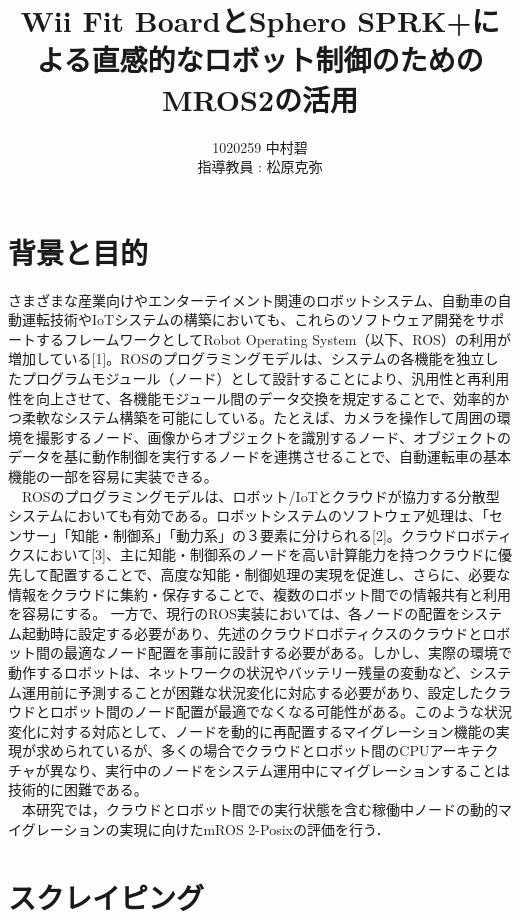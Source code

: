 \documentclass[11pt]{ujarticle}
\author{%
1020259 中村碧\\指導教員 : 松原克弥
}
\title{Wii Fit BoardとSphero SPRK+による直感的なロボット制御のためのMROS2の活用}
\begin{document}
\maketitle

\section{背景と目的}
さまざまな産業向けやエンターテイメント関連のロボットシステム、自動車の自動運転技術やIoTシステムの構築においても、これらのソフトウェア開発をサポートするフレームワークとしてRobot Operating System（以下、ROS）の利用が増加している[1]。ROSのプログラミングモデルは、システムの各機能を独立したプログラムモジュール（ノード）として設計することにより、汎用性と再利用性を向上させて、各機能モジュール間のデータ交換を規定することで、効率的かつ柔軟なシステム構築を可能にしている。たとえば、カメラを操作して周囲の環境を撮影するノード、画像からオブジェクトを識別するノード、オブジェクトのデータを基に動作制御を実行するノードを連携させることで、自動運転車の基本機能の一部を容易に実装できる。
\\　ROSのプログラミングモデルは、ロボット/IoTとクラウドが協力する分散型システムにおいても有効である。ロボットシステムのソフトウェア処理は、「センサー」「知能・制御系」「動力系」の３要素に分けられる[2]。クラウドロボティクスにおいて[3]、主に知能・制御系のノードを高い計算能力を持つクラウドに優先して配置することで、高度な知能・制御処理の実現を促進し、さらに、必要な情報をクラウドに集約・保存することで、複数のロボット間での情報共有と利用を容易にする。
一方で、現行のROS実装においては、各ノードの配置をシステム起動時に設定する必要があり、先述のクラウドロボティクスのクラウドとロボット間の最適なノード配置を事前に設計する必要がある。しかし、実際の環境で動作するロボットは、ネットワークの状況やバッテリー残量の変動など、システム運用前に予測することが困難な状況変化に対応する必要があり、設定したクラウドとロボット間のノード配置が最適でなくなる可能性がある。このような状況変化に対する対応として、ノードを動的に再配置するマイグレーション機能の実現が求められているが、多くの場合でクラウドとロボット間のCPUアーキテクチャが異なり、実行中のノードをシステム運用中にマイグレーションすることは技術的に困難である。
\\　本研究では，クラウドとロボット間での実行状態を含む稼働中ノードの動的マイグレーションの実現に向けたmROS 2-Posixの評価を行う．



\section{スクレイピング}
\end{document}
